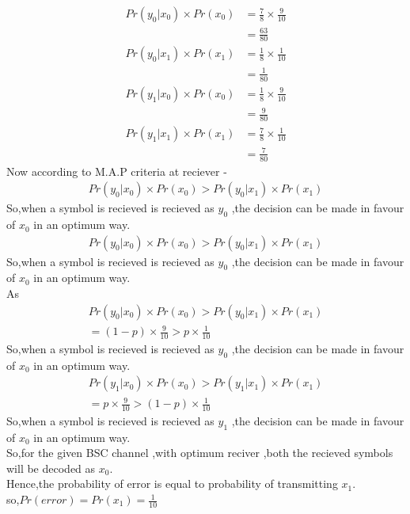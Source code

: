 \documentclass[journel,12pt,twocoloums]{IEEEtran}
\begin{document}
\begin{align}
 Pr(y_0|x_0) \times Pr(x_0) &= \frac{7}{8} \times \frac{9}{10} \\
                     &= \frac{63}{80}
\end{align}
\begin{align}
 Pr(y_0|x_1) \times Pr(x_1) &= \frac{1}{8} \times \frac{1}{10} \\
                     &= \frac{1}{80}
\end{align}
\begin{align}
 Pr(y_1|x_0) \times Pr(x_0) &= \frac{1}{8} \times \frac{9}{10} \\
                     &= \frac{9}{80}
\end{align}
\begin{align}
 Pr(y_1|x_1) \times Pr(x_1) &= \frac{7}{8} \times \frac{1}{10}\\
                     &= \frac{7}{80}
\end{align}
Now according to M.A.P criteria at reciever -\\
\begin{align}
Pr(y_0|x_0) \times Pr(x_0)>Pr(y_0|x_1) \times Pr(x_1)
\end{align}
So,when a symbol is recieved is recieved as $y_0$ ,the decision can be made in favour of $x_0$ in an optimum way.\\
\begin{align}
Pr(y_0|x_0) \times Pr(x_0)>Pr(y_0|x_1) \times Pr(x_1)
\end{align}
So,when a symbol is recieved is recieved as $y_0$ ,the decision can be made in favour of $x_0$ in an optimum way.\\
As\\
\begin{align}
Pr(y_0|x_0) \times Pr(x_0)>Pr(y_0|x_1) \times Pr(x_1)\\
=(1-p) \times \frac{9}{10}> p \times \frac{1}{10}
\end{align}
So,when a symbol is recieved is recieved as $y_0$ ,the decision can be made in favour of $x_0$ in an optimum way.\\
\begin{align}
Pr(y_1|x_0) \times Pr(x_0)>Pr(y_1|x_1) \times Pr(x_1)\\
=p \times \frac{9}{10}>(1-p) \times \frac{1}{10}
\end{align}
So,when a symbol is recieved is recieved as $y_1$ ,the decision can be made in favour of $x_0$ in an optimum way.\\
So,for the given BSC channel ,with optimum reciver ,both the recieved symbols will be decoded as $x_0$.\\
Hence,the probability of error is equal to probability of transmitting $x_1$.\\
so,$Pr(error)=Pr(x_1)=\frac{1}{10}$
\end{document}
